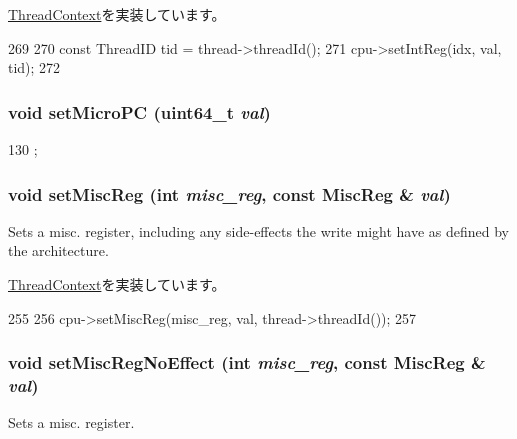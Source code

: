 \hyperlink{classThreadContext_a017c099cd6087484b0eb1892809b0572}{ThreadContext}を実装しています。


\begin{DoxyCode}
269 {
270     const ThreadID tid = thread->threadId();
271     cpu->setIntReg(idx, val, tid);
272 }
\end{DoxyCode}
\hypertarget{classInOrderThreadContext_a12ffdd4e1d5fbd2b5ed83f9ae70af0bb}{
\subsubsection[{setMicroPC}]{\setlength{\rightskip}{0pt plus 5cm}void setMicroPC (uint64\_\-t {\em val})}}
\label{classInOrderThreadContext_a12ffdd4e1d5fbd2b5ed83f9ae70af0bb}



\begin{DoxyCode}
130 { };
\end{DoxyCode}
\hypertarget{classInOrderThreadContext_a1877dde4f3eb17a8b7d33ea40176c148}{
\subsubsection[{setMiscReg}]{\setlength{\rightskip}{0pt plus 5cm}void setMiscReg (int {\em misc\_\-reg}, \/  const {\bf MiscReg} \& {\em val})}}
\label{classInOrderThreadContext_a1877dde4f3eb17a8b7d33ea40176c148}
Sets a misc. register, including any side-\/effects the write might have as defined by the architecture. 

\hyperlink{classThreadContext_a074166dc2fe3c4aea3ad588ed9883c51}{ThreadContext}を実装しています。


\begin{DoxyCode}
255 {
256     cpu->setMiscReg(misc_reg, val, thread->threadId());
257 }
\end{DoxyCode}
\hypertarget{classInOrderThreadContext_a763517aaea2f3decbc1ef9d064216b6f}{
\subsubsection[{setMiscRegNoEffect}]{\setlength{\rightskip}{0pt plus 5cm}void setMiscRegNoEffect (int {\em misc\_\-reg}, \/  const {\bf MiscReg} \& {\em val})}}
\label{classInOrderThreadContext_a763517aaea2f3decbc1ef9d064216b6f}
Sets a misc. register. 

